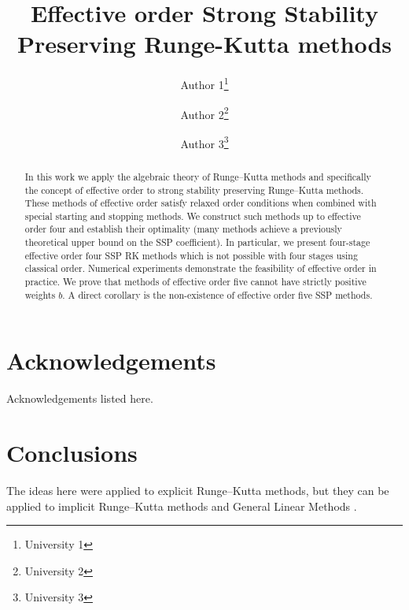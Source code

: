 \documentclass[10pt,a4paper,oneside,draft]{article}
\title{Effective order Strong Stability Preserving Runge-Kutta methods}
\author{Author 1\footnote{University 1}
        \and
        Author 2\footnote{University 2}
        \and
        Author 3\footnote{University 3}}
\numberwithin{equation}{section}
\numberwithin{definition}{section}
\numberwithin{theorem}{section}
\numberwithin{lemma}{section}
\numberwithin{example}{section}
\numberwithin{table}{section}
\begin{document}
\maketitle


\begin{abstract}
  In this work we apply the algebraic theory of Runge--Kutta methods
  and specifically the concept of effective order to strong stability
  preserving Runge--Kutta methods.  These methods of effective order
  satisfy relaxed order conditions when combined with special starting
  and stopping methods.  We construct such methods up to effective
  order four and establish their optimality (many methods achieve a
  previously theoretical upper bound on the SSP coefficient).  In
  particular, we present four-stage effective order four SSP RK
  methods which is not possible with four stages using classical
  order.  Numerical experiments demonstrate the feasibility of
  effective order in practice.  We prove that methods of effective
  order five cannot have strictly positive weights $b$.  A direct
  corollary is the non-existence of effective order five SSP methods.
\end{abstract}

\tableofcontents



%






%
%	
%
%
%
%


\section*{Acknowledgements}
	Acknowledgements listed here.


\section{Conclusions}\label{sec:conclusions}

The ideas here were applied to explicit Runge--Kutta methods, but they
can be applied to implicit Runge--Kutta methods and General Linear
Methods \cite{Butcher2008_book}.


\appendix

%


\end{document}
